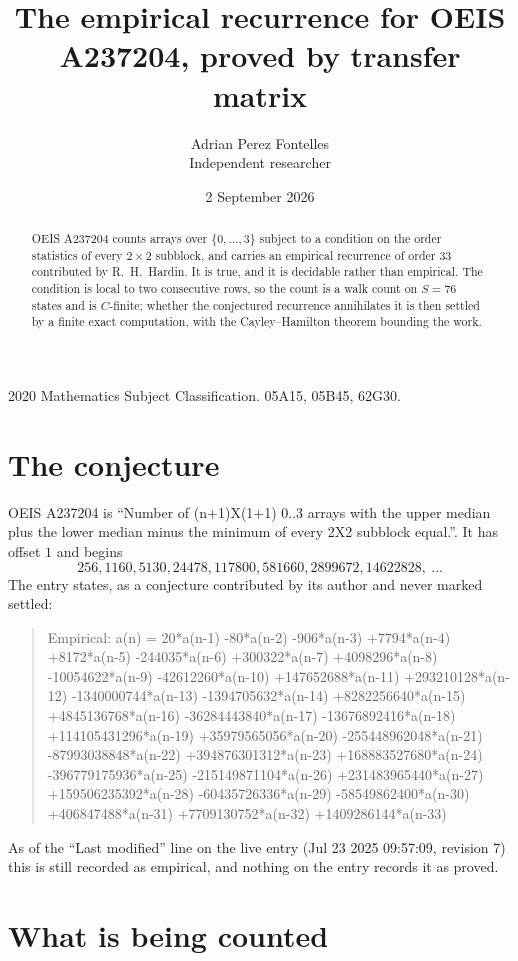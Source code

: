 \documentclass[11pt,a4paper]{article}
\title{The empirical recurrence for OEIS A237204, proved by transfer matrix}
\author{Adrian Perez Fontelles\\ \small Independent researcher}
\date{2 September 2026}
\theoremstyle{plain}
\theoremstyle{definition}
\begin{document}
\maketitle

\begin{abstract}
OEIS A237204 counts arrays over $\{0,\dots,3\}$ subject to a condition on the order
statistics of every $2\times2$ subblock, and carries an empirical recurrence of order
$33$ contributed by R.~H.~Hardin. It is true, and it is decidable rather than empirical.
The condition is local to two consecutive rows, so the count is a walk count on $S=76$
states and is $C$-finite; whether the conjectured recurrence annihilates it is then settled by
a finite exact computation, with the Cayley--Hamilton theorem bounding the work.
\end{abstract}

\noindent\small 2020 Mathematics Subject Classification. 05A15, 05B45, 62G30.\normalsize

\section{The conjecture}

OEIS A237204 is ``Number of (n+1)X(1+1) 0..3 arrays with the upper median plus the lower median minus the minimum of every 2X2 subblock equal.''. It has offset $1$ and begins
\[
256, 1160, 5130, 24478, 117800, 581660, 2899672, 14622828,\ \dots
\]
The entry states, as a conjecture contributed by its author and never marked settled:
\begin{quote}
Empirical: a(n) = 20*a(n-1) -80*a(n-2) -906*a(n-3) +7794*a(n-4) +8172*a(n-5) -244035*a(n-6) +300322*a(n-7) +4098296*a(n-8) -10054622*a(n-9) -42612260*a(n-10) +147652688*a(n-11) +293210128*a(n-12) -1340000744*a(n-13) -1394705632*a(n-14) +8282256640*a(n-15) +4845136768*a(n-16) -36284443840*a(n-17) -13676892416*a(n-18) +114105431296*a(n-19) +35979565056*a(n-20) -255448962048*a(n-21) -87993038848*a(n-22) +394876301312*a(n-23) +168883527680*a(n-24) -396779175936*a(n-25) -215149871104*a(n-26) +231483965440*a(n-27) +159506235392*a(n-28) -60435726336*a(n-29) -58549862400*a(n-30) +406847488*a(n-31) +7709130752*a(n-32) +1409286144*a(n-33)
\end{quote}
As of the ``Last modified'' line on the live entry (Jul 23 2025 09:57:09, revision 7) this is still
recorded as empirical, and nothing on the entry records it as proved.

\section{What is being counted}
\end{document}
